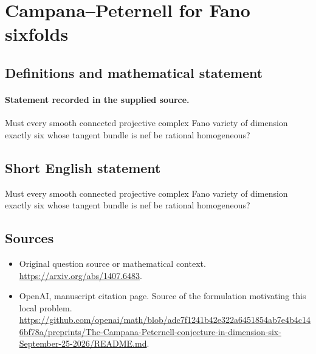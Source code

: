 \documentclass[11pt]{article}
\begin{document}
\section*{Campana–Peternell for Fano sixfolds}\label{statement}
\subsection{Definitions and mathematical statement}
\paragraph{Statement recorded in the supplied source.}
Must every smooth connected projective complex Fano variety of dimension exactly six whose tangent bundle is nef be rational homogeneous?
\subsection{Short English statement}
Must every smooth connected projective complex Fano variety of dimension exactly six whose tangent bundle is nef be rational homogeneous?
\subsection{Sources}
\begin{itemize}
\item[S1] Original question source or mathematical context.
\url{https://arxiv.org/abs/1407.6483}.
\item[S2] OpenAI, manuscript citation page. Source of the formulation motivating this local problem.
\url{https://github.com/openai/math/blob/adc7f1241b42e322a6451854ab7e4b4c146bf78a/preprints/The-Campana-Peternell-conjecture-in-dimension-six-September-25-2026/README.md}.
\end{itemize}
\end{document}
